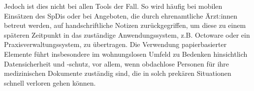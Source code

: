 Jedoch ist dies nicht bei allen Tools der Fall. So wird häufig bei mobilen Einsätzen des \acp{SpDi} oder bei Angeboten, die durch ehrenamtliche Ärzt:innen betreut werden, auf handschriftliche Notizen zurückgegriffen, um diese zu einem späteren Zeitpunkt in das zuständige Anwendungssystem, z.B. Octoware oder ein Praxisverwaltungssystem, zu übertragen. Die Verwendung papierbasierter Elemente führt insbesondere im wohnungslosen Umfeld zu Bedenken hinsichtlich Datensicherheit und -schutz, vor allem, wenn obdachlose Personen für ihre medizinischen Dokumente zuständig sind, die in solch prekären Situationen schnell verloren gehen können.